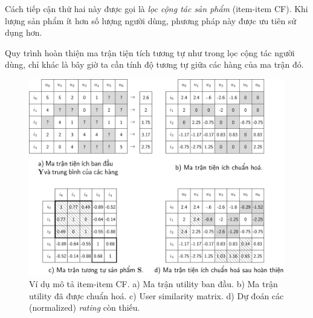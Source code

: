 Cách tiếp cận thứ hai này được gọi là \textit{lọc cộng tác sản phẩm} ({item-item CF}). Khi lượng sản phẩm ít hơn số lượng người dùng, phương
pháp này được ưu tiên sử dụng hơn.
 
Quy trình hoàn thiện ma trận tiện tích tương tự như trong lọc cộng tác người dùng, chỉ khác là bây giờ ta cần tính độ tương tự giữa các hàng của ma trận đó. 

\begin{figure}[t]
\centering
    \includegraphics[width = \textwidth]{Chapters/06_RecommendationSystems/24_collaborativefiltering/latex/item_cf_gray.pdf}
    \caption[]{Ví dụ mô tả item-item CF. a) Ma trận utility
    ban đầu. b) Ma trận utility  đã được chuẩn hoá. c) User similarity matrix.
    d) Dự đoán các (normalized) \textit{rating} còn thiếu.}
    \label{fig:24_3}
\end{figure}
 
